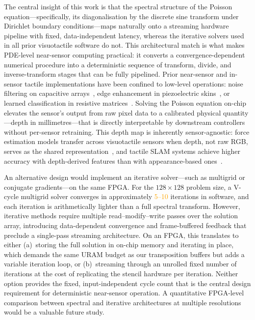 \documentclass[10pt,a4paper]{article}
\newcommand{\placeholder}[1]{\textcolor{orange}{#1}}
\begin{document}
The central insight of this work is that the spectral structure of the Poisson equation---specifically, its diagonalisation by the discrete sine transform under Dirichlet boundary conditions---maps naturally onto a streaming hardware pipeline with fixed, data-independent latency, whereas the iterative solvers used in all prior visuotactile software do not. This architectural match is what makes PDE-level near-sensor computing practical: it converts a convergence-dependent numerical procedure into a deterministic sequence of transform, divide, and inverse-transform stages that can be fully pipelined. Prior near-sensor and in-sensor tactile implementations have been confined to low-level operations: noise filtering on capacitive arrays~\cite{chen2025capacitive}, edge enhancement in piezoelectric skins~\cite{cho2025npjflex}, or learned classification in resistive matrices~\cite{zhou2020nearsensor}. Solving the Poisson equation on-chip elevates the sensor's output from raw pixel data to a calibrated physical quantity---depth in millimetres---that is directly interpretable by downstream controllers without per-sensor retraining. This depth map is inherently sensor-agnostic: force estimation models transfer across visuotactile sensors when depth, not raw RGB, serves as the shared representation~\cite{chen2026genforce}, and tactile SLAM systems achieve higher accuracy with depth-derived features than with appearance-based ones~\cite{zhao2026gelslam}.

An alternative design would implement an iterative solver---such as multigrid or conjugate gradients---on the same FPGA. For the $128 \times 128$ problem size, a V-cycle multigrid solver converges in approximately \placeholder{5--10} iterations in software, and each iteration is arithmetically lighter than a full spectral transform. However, iterative methods require multiple read--modify--write passes over the solution array, introducing data-dependent convergence and frame-buffered feedback that preclude a single-pass streaming architecture. On an FPGA, this translates to either (a)~storing the full solution in on-chip memory and iterating in place, which demands the same URAM budget as our transposition buffers but adds a variable iteration loop, or (b)~streaming through an unrolled fixed number of iterations at the cost of replicating the stencil hardware per iteration. Neither option provides the fixed, input-independent cycle count that is the central design requirement for deterministic near-sensor operation. A quantitative FPGA-level comparison between spectral and iterative architectures at multiple resolutions would be a valuable future study.
\end{document}
